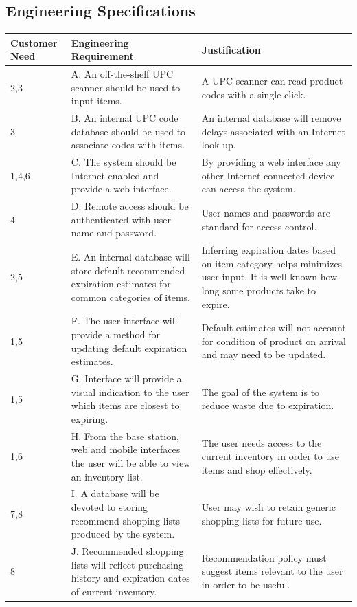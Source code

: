 \documentclass[11pt]{article} %
\begin{document}
\subsection{Engineering Specifications}
\begin{table}[h!]
\begin{center}
\begin{tabular}{| p{1.2in} | p{2.5in} |p{2.5in} |}
\hline
Customer Need & Engineering Requirement & Justification \\
\hline
2,3 &A. An off-the-shelf UPC scanner should be used to input items. & A UPC scanner can read product codes with a single click.\\
\hline
3 &B. An internal UPC code database should be used to associate codes with items.&An internal database will remove delays associated with an Internet look-up.\\
\hline
1,4,6&C. The system should be Internet enabled and provide a web interface.&By providing a web interface any other Internet-connected device can access the system.\\
\hline
4&D. Remote access should be authenticated with user name and password.&User names and passwords are standard for access control.\\
\hline
2,5&E. An internal database will store default recommended expiration estimates for common categories of items.&Inferring expiration dates based on item category helps minimizes user input. It is well known how long some products take to expire.\\
\hline
1,5&F. The user interface will provide a method for updating default expiration estimates.&Default estimates will not account for condition of product on arrival and may need to be updated.\\
\hline
1,5&G. Interface will provide a visual indication to the user which items are closest to expiring.&The goal of the system is to reduce waste due to expiration.\\
\hline
1,6&H. From the base station, web and mobile interfaces the user will be able to view an inventory list.&The user needs access to the current inventory in order to use items and shop effectively.\\
\hline
7,8&I. A database will be devoted to storing recommend shopping lists produced by the system.&User may wish to retain generic shopping lists for future use.\\
\hline
8&J. Recommended shopping lists will reflect purchasing history and expiration dates of current inventory.&Recommendation policy must suggest items relevant to the user in order to be useful.\\

\end{tabular}
\end{center}
\end{table}
\end{document}

